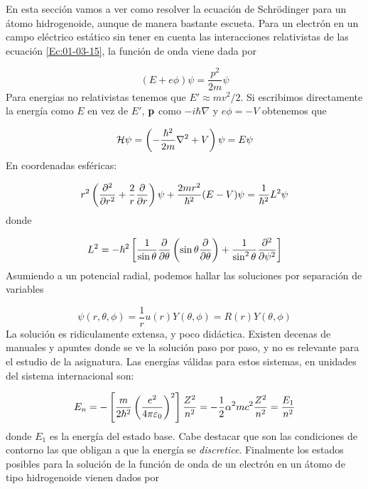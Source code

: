 En esta sección vamos a ver como resolver la ecuación de Schrödinger para un átomo hidrogenoide, aunque de manera bastante escueta. Para un electrón en un campo eléctrico estático sin tener en cuenta las interacciones relativistas de las ecuación \ref{Ec:01-03-15}, la función de onda viene dada por

\begin{equation}
    (E+e\phi) \psi = \frac{p^2}{2m} \psi
\end{equation}
Para energias no relativistas tenemos que $E'\approx mv^2/2$. Si escribimos directamente la energía como $E$ en vez de $E'$, $\mathbf{p} $ como $-i\hbar \nabla$ y $e \phi = -V$ obtenemos que

\begin{equation}
    \mathcal{H} \psi = \left( - \frac{\hbar^2}{2m} \nabla^2 + V \right) \psi = E \psi
\end{equation}
En coordenadas esféricas:

\begin{equation}
    r^2 \left( \frac{\partial ^2}{\partial r^2} + \frac{2}{r} \frac{\partial }{\partial r} \right) \psi + \frac{2mr^2}{\hbar^2} (E-V) \psi = \frac{1}{\hbar^2} L^2 \psi
\end{equation}
donde 

\begin{equation}
    L^2 = - \hbar^2 \left[ \frac{1}{\sin \theta} \frac{\partial }{\partial \theta} \left( \sin  \theta \frac{\partial }{\partial \theta} \right) + \frac{1}{\sin^2 \theta} \frac{\partial ^2}{\partial \psi^2} \right]
\end{equation}
Asumiendo a un potencial radial, podemos hallar las soluciones por separación de variables

\begin{equation}
    \psi (r,\theta,\phi) =  \frac{1}{r} u(r) Y(\theta,\phi) = R(r) Y(\theta, \phi)
\end{equation}
La solución es ridiculamente extensa, y poco didáctica. Existen decenas de manuales y apuntes donde se ve la solución paso por paso, y no es relevante para el estudio de la asignatura. Las energías válidas para estos sistemas, en unidades del sistema internacional son: %

\begin{equation}
    E_n = - \left[ \frac{m}{2\hbar^2} \left( \frac{e^2}{4 \pi \varepsilon_0} \right)^2 \right] \frac{Z^2}{n^2} = - \frac{1}{2} \alpha^2 m c^2 \frac{Z^2}{n^2 } = \frac{E_1}{n^2}
\end{equation}
donde $E_1$ es la energía del estado base. Cabe destacar que son las condiciones de contorno las que obligan a que la energía se \textit{discretice}. Finalmente los estados posibles para la solución de la función de onda de un electrón en un átomo de tipo hidrogenoide vienen dados por

